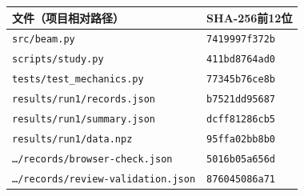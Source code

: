 \begin{tabular}{ll}\toprule 文件（项目相对路径） & SHA-256前12位\\\midrule
\nolinkurl{src/beam.py} & \texttt{7419997f372b} \\
\nolinkurl{scripts/study.py} & \texttt{411bd8764ad0} \\
\nolinkurl{tests/test_mechanics.py} & \texttt{77345b76ce8b} \\
\nolinkurl{results/run1/records.json} & \texttt{b7521dd95687} \\
\nolinkurl{results/run1/summary.json} & \texttt{dcff81286cb5} \\
\nolinkurl{results/run1/data.npz} & \texttt{95ffa02bb8b0} \\
\nolinkurl{…/records/browser-check.json} & \texttt{5016b05a656d} \\
\nolinkurl{…/records/review-validation.json} & \texttt{876045086a71} \\
\bottomrule\end{tabular}
